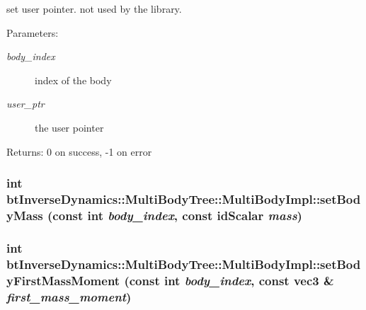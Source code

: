 set user pointer. not used by the library. \begin{Desc}
\item[Parameters:]
\begin{description}
\item[{\em body\_\-index}]index of the body \item[{\em user\_\-ptr}]the user pointer \end{description}
\end{Desc}
\begin{Desc}
\item[Returns:]0 on success, -1 on error \end{Desc}
 \hypertarget{classbt_inverse_dynamics_1_1_multi_body_tree_1_1_multi_body_impl_39c5abc3579669646d6c669a7e86032e}{
\subsubsection[setBodyMass]{\setlength{\rightskip}{0pt plus 5cm}int btInverseDynamics::MultiBodyTree::MultiBodyImpl::setBodyMass (const int {\em body\_\-index}, \/  const idScalar {\em mass})}}
\label{classbt_inverse_dynamics_1_1_multi_body_tree_1_1_multi_body_impl_39c5abc3579669646d6c669a7e86032e}


 \hypertarget{classbt_inverse_dynamics_1_1_multi_body_tree_1_1_multi_body_impl_bf4ba386bf4546e4bf05588d46cd82b5}{
\subsubsection[setBodyFirstMassMoment]{\setlength{\rightskip}{0pt plus 5cm}int btInverseDynamics::MultiBodyTree::MultiBodyImpl::setBodyFirstMassMoment (const int {\em body\_\-index}, \/  const {\bf vec3} \& {\em first\_\-mass\_\-moment})}}
\label{classbt_inverse_dynamics_1_1_multi_body_tree_1_1_multi_body_impl_bf4ba386bf4546e4bf05588d46cd82b5}


